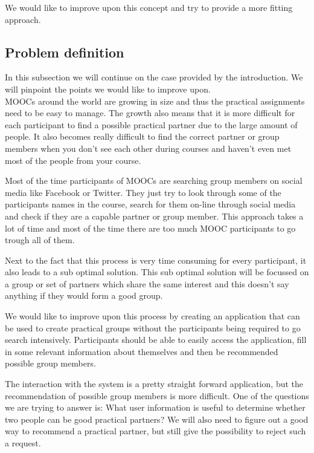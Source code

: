\documentclass[]{article}
\begin{document}
We would like to improve upon this concept and try to provide a more fitting approach.

\subsection{Problem definition}
In this subsection we will continue on the case provided by the introduction.
We will pinpoint the points we would like to improve upon.\\

MOOCs around the world are growing in size and thus the practical assignments need to be easy to manage.
The growth also means that it is more difficult for each participant to find a possible practical partner due to the large amount of people.
It also becomes really difficult to find the correct partner or group members when you don't see each other during courses and haven't even met most of the people from your course.

Most of the time participants of MOOCs are searching group members on social media like Facebook or Twitter.
They just try to look through some of the participants names in the course, search for them on-line through social media and check if they are a capable partner or group member.
This approach takes a lot of time and most of the time there are too much MOOC participants to go trough all of them.

Next to the fact that this process is very time consuming for every participant, it also leads to a sub optimal solution.
This sub optimal solution will be focussed on a group or set of partners which share the same interest and this doesn't say anything if they would form a good group.

We would like to improve upon this process by creating an application that can be used to create practical groups without the participants being required to go search intensively.
Participants should be able to easily access the application, fill in some relevant information about themselves and then be recommended possible group members.

The interaction with the system is a pretty straight forward application, but the recommendation of possible group members is more difficult.
One of the questions we are trying to answer is: What user information is useful to determine whether two people can be good practical partners?
We will also need to figure out a good way to recommend a practical partner, but still give the possibility to reject such a request.
\end{document}
